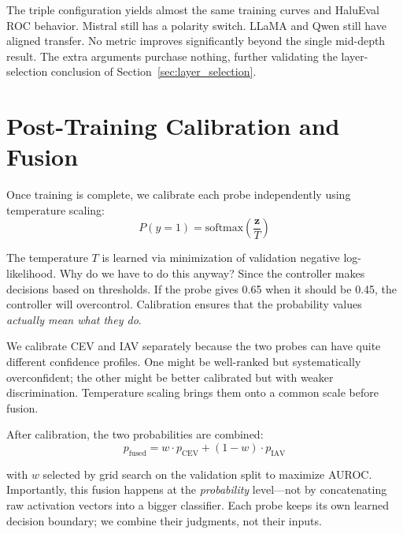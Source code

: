 The triple configuration yields almost the same training curves and HaluEval ROC behavior. Mistral still has a polarity switch. LLaMA and Qwen still have aligned transfer. No metric improves significantly beyond the single mid-depth result. The extra arguments purchase nothing, further validating the layer-selection conclusion of Section~\ref{sec:layer_selection}.

\newpage
\section{Post-Training Calibration and Fusion}
\label{sec:calibration_fusion}

Once training is complete, we calibrate each probe independently using temperature scaling:
\begin{equation}
    P(y = 1) = \text{softmax}\!\left(\frac{\mathbf{z}}{T}\right)
\end{equation}

\noindent  The temperature $T$ is learned via minimization of validation negative log-likelihood. Why do we have to do this anyway? Since the controller makes decisions based on thresholds. If the probe gives 0.65 when it should be 0.45, the controller will overcontrol. Calibration ensures that the probability values \emph{actually mean what they do}.

We calibrate CEV and IAV separately because the two probes can have quite different confidence profiles. One might be well-ranked but systematically overconfident; the other might be better calibrated but with weaker discrimination. Temperature scaling brings them onto a common scale before fusion.

After calibration, the two probabilities are combined:
\[
    p_{\text{fused}} = w \cdot p_{\text{CEV}} + (1 - w) \cdot p_{\text{IAV}}
\]

\noindent with $w$ selected by grid search on the validation split to maximize AUROC. Importantly, this fusion happens at the \emph{probability} level—not by concatenating raw activation vectors into a bigger classifier. Each probe keeps its own learned decision boundary; we combine their judgments, not their inputs.

